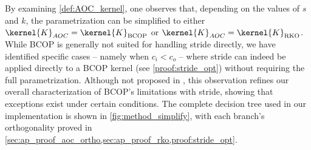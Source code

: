     By examining \cref{def:AOC_kernel}, one observes that, depending on the values of $s$ and $k$, the parametrization can be simplified to either $ \kernel{K}_{AOC} = \kernel{K}_{\text{BCOP}} $ or  $\kernel{K}_{AOC} = \kernel{K}_{\text{RKO}}$. While BCOP is generally not suited for handling stride directly, we have identified specific cases -- namely when $c_i < c_o$ -- where stride can indeed be applied directly to a BCOP kernel (see \cref{proof:stride_opt}) without requiring the full parametrization. Although not proposed in \cite{li_preventing_2019}, this observation refines our overall characterization of BCOP’s limitations with stride, showing that exceptions exist under certain conditions. The complete decision tree used in our implementation is shown in \cref{fig:method_simplify}, with each branch’s orthogonality proved in \cref{sec:ap_proof_aoc_ortho,sec:ap_proof_rko,proof:stride_opt}.
    
    
